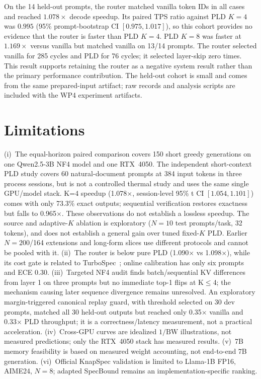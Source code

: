 \documentclass[10pt,twocolumn,letterpaper]{article}
\begin{document}
On the 14 held-out prompts, the router matched vanilla token IDs in all cases and reached $1.078\times$ decode speedup. Its paired TPS ratio against PLD $K{=}4$ was $0.995$ (95\% prompt-bootstrap CI $[0.975,1.017]$), so this cohort provides no evidence that the router is faster than PLD $K{=}4$. PLD $K{=}8$ was faster at $1.169\times$ versus vanilla but matched vanilla on 13/14 prompts. The router selected vanilla for 285 cycles and PLD for 76 cycles; it selected layer-skip zero times. This result supports retaining the router as a negative system result rather than the primary performance contribution. The held-out cohort is small and comes from the same prepared-input artifact; raw records and analysis scripts are included with the WP4 experiment artifacts.



\section{Limitations}
\label{sec:limitations}

(i)~The equal-horizon paired comparison covers 150 short greedy generations on one Qwen2.5-3B NF4 model and one RTX~4050. The independent short-context PLD study covers 60 natural-document prompts at 384 input tokens in three process sessions, but is not a controlled thermal study and uses the same single GPU/model stack. K=4 speedup (1.078$\times$, session-level 95\% t CI $[1.054,1.101]$) comes with only 73.3\% exact outputs; sequential verification restores exactness but falls to 0.965$\times$. These observations do not establish a lossless speedup. The source and adaptive-$K$ ablation is exploratory ($N{=}10$ test prompts/task, 32 tokens), and does not establish a general gain over tuned fixed-$K$ PLD. Earlier $N{=}200$/164 extensions and long-form slices use different protocols and cannot be pooled with it. (ii)~The router is below pure PLD (1.090$\times$ vs 1.098$\times$), while its cost gate is related to TurboSpec~\cite{turbospec2025}; online calibration has only six prompts and ECE $0.30$. (iii)~Targeted NF4 audit finds batch/sequential KV differences from layer 1 on three prompts but no immediate top-1 flips at K$\le$4; the mechanism causing later sequence divergence remains unresolved. An exploratory margin-triggered canonical replay guard, with threshold selected on 30 dev prompts, matched all 30 held-out outputs but reached only 0.35$\times$ vanilla and 0.33$\times$ PLD throughput; it is a correctness/latency measurement, not a practical acceleration. (iv)~Cross-GPU curves are idealized $1/\mathrm{BW}$ illustrations, not measured predictions; only the RTX~4050 stack has measured results. (v)~7B memory feasibility is based on measured weight accounting, not end-to-end 7B generation. (vi)~Official KnapSpec validation is limited to Llama-1B FP16, AIME24, $N{=}8$; adapted SpecBound remains an implementation-specific ranking.
\end{document}
